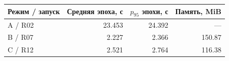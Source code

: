 \begin{tabular}{lrrr}
\toprule
Режим / запуск & Средняя эпоха, с & $p_{95}$ эпохи, с & Память, MiB \\
\midrule
A / R02 & 23.453 & 24.392 & --- \\
B / R07 & 2.227 & 2.366 & 150.87 \\
C / R12 & 2.521 & 2.764 & 116.38 \\
\bottomrule
\end{tabular}
